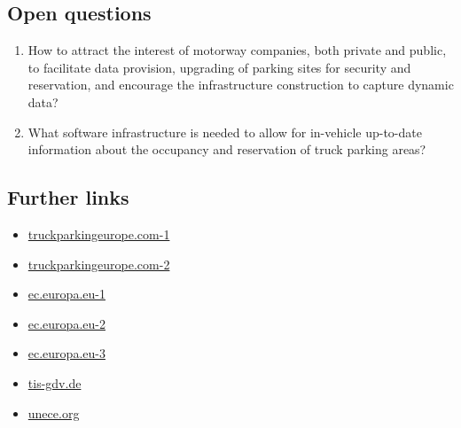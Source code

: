 \documentclass[
]{book}
\providecommand{\tightlist}{%
  \setlength{\itemsep}{0pt}\setlength{\parskip}{0pt}}
\begin{document}
\hypertarget{open-questions-31}{%
\subsection*{Open questions}\label{open-questions-31}}

\begin{enumerate}
\def\labelenumi{\arabic{enumi}.}
\tightlist
\item
  How to attract the interest of motorway companies, both private and public, to facilitate data provision, upgrading of parking sites for security and reservation, and encourage the infrastructure construction to capture dynamic data?
\item
  What software infrastructure is needed to allow for in-vehicle up-to-date information about the occupancy and reservation of truck parking areas?
\end{enumerate}

\hypertarget{further-links-28}{%
\subsection*{Further links}\label{further-links-28}}

\begin{itemize}
\tightlist
\item
  \href{https://www.truckparkingeurope.com/secure-truck-parking-overview/}{truckparkingeurope.com-1}
\item
  \href{https://www.truckparkingeurope.com/how-do-i-reserve-a-secure-truck-parking-spot/}{truckparkingeurope.com-2}
\item
  \href{https://ec.europa.eu/transport/themes/its/road/action_plan/intelligent-truck-parking_en}{ec.europa.eu-1}
\item
  \href{https://ec.europa.eu/transport/sites/transport/files/modes/road/parking/doc/2010_04_28_setpos_project_handbook.pdf}{ec.europa.eu-2}
\item
  \href{https://ec.europa.eu/transport/sites/transport/files/2019-study-on-safe-and-secure-parking-places-for-trucks.pdf}{ec.europa.eu-3}
\item
  \href{https://www.tis-gdv.de/tis_e/bedingungen/parken/lpp-htm/}{tis-gdv.de}
\item
  \href{https://unece.org/DAM/trans/doc/2008/sc1/ECE-TRANS-SC1-103-pres01e.pdf}{unece.org}
\end{itemize}
\end{document}
